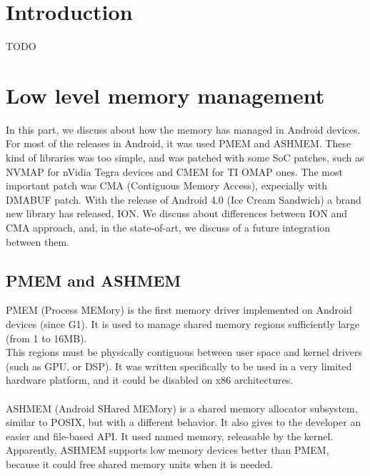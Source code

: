 \documentclass[a4paper,10pt]{article}
\begin{document}
\vspace{4ex}	%
\begin{multicols}{2}

\section{Introduction}

TODO

\section{Low level memory management}
In this part, we discuss about how the memory has managed in Android devices. For
most of the releases in Android, it was used PMEM and ASHMEM. These kind of libraries
was too simple, and was patched with some SoC patches, such as NVMAP for nVidia Tegra devices
and CMEM for TI OMAP ones. The most important patch was CMA (Contiguous Memory Access), expecially
with DMABUF patch. With the release of Android 4.0 (Ice Cream Sandwich) a brand new library has released,
ION. We discuss about differences between ION and CMA approach, and, in the state-of-art, 
we discuss of a future integration between them.

\subsection{PMEM and ASHMEM}

PMEM (Process MEMory) is the first memory driver implemented on Android devices (since G1).
It is used to manage shared memory regions sufficiently large (from 1 to 16MB).\\
This regions must be physically contiguous between user space and kernel drivers (such as GPU, or DSP).
It was written specifically to be used in a very limited hardware platform, and it could be disabled on x86 architectures.
\\
\\
ASHMEM (Android SHared MEMory) is a shared memory allocator subsystem, similar to POSIX, but with a
different behavior. It also gives to the developer an easier and file-based API.
It used named memory, releasable by the kernel.
Apparently, ASHMEM supports low memory devices better than PMEM, because it could
free shared memory units when it is needed.


\end{multicols}
\end{document}
